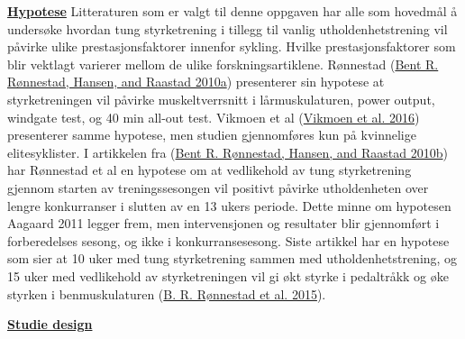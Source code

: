 \documentclass[
]{book}
\begin{document}
\underline{\textbf{Hypotese}} Litteraturen som er valgt til denne
oppgaven har alle som hovedmål å undersøke hvordan tung styrketrening i
tillegg til vanlig utholdenhetstrening vil påvirke ulike
prestasjonsfaktorer innenfor sykling. Hvilke prestasjonsfaktorer som
blir vektlagt varierer mellom de ulike forskningsartiklene. Rønnestad
(\protect\hyperlink{ref-ruxf8nnestad2010b}{Bent R. Rønnestad, Hansen,
and Raastad 2010a}) presenterer sin hypotese at styrketreningen vil
påvirke muskeltverrsnitt i lårmuskulaturen, power output, windgate test,
og 40 min all-out test. Vikmoen et al
(\protect\hyperlink{ref-vikmoen2016}{Vikmoen et al. 2016}) presenterer
samme hypotese, men studien gjennomføres kun på kvinnelige
elitesyklister. I artikkelen fra
(\protect\hyperlink{ref-ruxf8nnestad2010a}{Bent R. Rønnestad, Hansen,
and Raastad 2010b}) har Rønnestad et al en hypotese om at vedlikehold av
tung styrketrening gjennom starten av treningssesongen vil positivt
påvirke utholdenheten over lengre konkurranser i slutten av en 13 ukers
periode. Dette minne om hypotesen Aagaard 2011 legger frem, men
intervensjonen og resultater blir gjennomført i forberedelses sesong, og
ikke i konkurransesesong. Siste artikkel har en hypotese som sier at 10
uker med tung styrketrening sammen med utholdenhetstrening, og 15 uker
med vedlikehold av styrketreningen vil gi økt styrke i pedaltråkk og øke
styrken i benmuskulaturen (\protect\hyperlink{ref-ruxf8nnestad2015}{B.
R. Rønnestad et al. 2015}).

\underline{\textbf{Studie design}}
\end{document}
